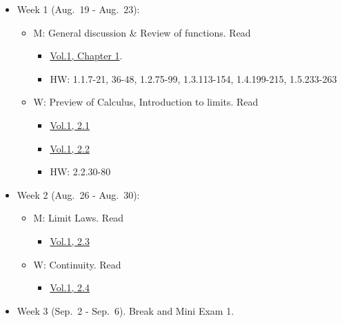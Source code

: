 \documentclass[
]{article}
\providecommand{\tightlist}{%
  \setlength{\itemsep}{0pt}\setlength{\parskip}{0pt}}
\begin{document}
\begin{itemize}
\tightlist
\item
  Week 1 (Aug.~19 - Aug.~23):

  \begin{itemize}
  \tightlist
  \item
    M: General discussion \& Review of functions. Read

    \begin{itemize}
    \tightlist
    \item
      \href{https://openstax.org/books/calculus-volume-1/pages/1-introduction}{Vol.1, Chapter 1}.
    \item
      HW: 1.1.7-21, 36-48, 1.2.75-99, 1.3.113-154, 1.4.199-215, 1.5.233-263
    \end{itemize}
  \item
    W: Preview of Calculus, Introduction to limits. Read

    \begin{itemize}
    \tightlist
    \item
      \href{https://openstax.org/books/calculus-volume-1/pages/2-1-a-preview-of-calculus}{Vol.1, 2.1}
    \item
      \href{https://openstax.org/books/calculus-volume-1/pages/2-2-the-limit-of-a-function}{Vol.1, 2.2}
    \item
      HW: 2.2.30-80
    \end{itemize}
  \end{itemize}
\item
  Week 2 (Aug.~26 - Aug.~30):

  \begin{itemize}
  \tightlist
  \item
    M: Limit Laws. Read

    \begin{itemize}
    \tightlist
    \item
      \href{https://openstax.org/books/calculus-volume-1/pages/2-3-the-limit-laws}{Vol.1, 2.3}
    \end{itemize}
  \item
    W: Continuity. Read

    \begin{itemize}
    \tightlist
    \item
      \href{https://openstax.org/books/calculus-volume-1/pages/2-4-continuity}{Vol.1, 2.4}
    \end{itemize}
  \end{itemize}
\item
  Week 3 (Sep.~2 - Sep.~6). Break and Mini Exam 1.


\end{itemize}
\end{document}

